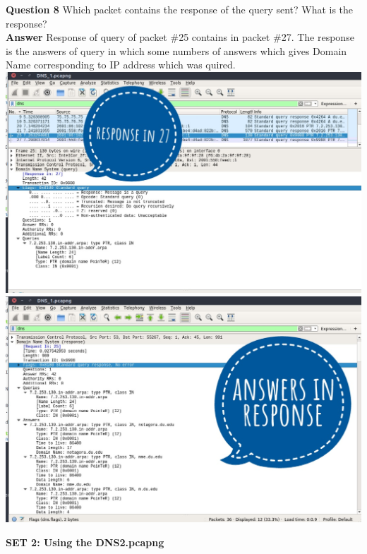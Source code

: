 \documentclass[14pt]{extarticle}
\begin{document}
    \noindent
    \textbf{\large Question 8}
    Which packet contains the response of the query sent? What is the response?\\[10pt]
    \textbf{\large Answer}
    Response of query of packet \#25 contains in packet \#27. The response is the answers of query in which some numbers of answers 
    which gives Domain Name corresponding to IP address which was quired.\\[10pt]
    \includegraphics[scale=0.45]{1_8_1}\\[10pt]
    \includegraphics[scale=0.45]{1_8_2}
    \vspace{1cm}

    \begin{center}
        {\Large \textbf{SET 2: Using the DNS2.pcapng }}
    \end{center}
\end{document}
